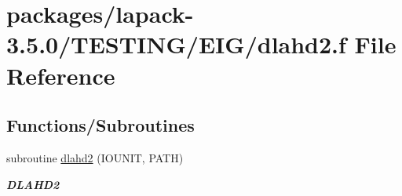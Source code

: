 \hypertarget{dlahd2_8f}{}\section{packages/lapack-\/3.5.0/\+T\+E\+S\+T\+I\+N\+G/\+E\+I\+G/dlahd2.f File Reference}
\label{dlahd2_8f}
\subsection*{Functions/\+Subroutines}
\begin{DoxyCompactItemize}
\item 
subroutine \hyperlink{group__double__eig_gaf5ca6e066facb65a20568f3b790f1624}{dlahd2} (I\+O\+U\+N\+I\+T, P\+A\+T\+H)
\begin{DoxyCompactList}\small\item\em {\bfseries D\+L\+A\+H\+D2} \end{DoxyCompactList}\end{DoxyCompactItemize}
